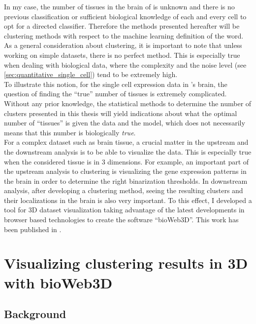 	In my case, the number of tissues in the brain of \platy{} is unknown and there is no previous classification or sufficient biological knowledge of each and every cell to opt for a directed classifier. Therefore the methods presented hereafter will be clustering methods with respect to the machine learning definition of the word.\\
	
	As a general consideration about clustering, it is important to note that unless working on simple datasets, there is no perfect method. This is especially true when dealing with biological data, where the complexity and the noise level (see \ref{sec:quantitative_single_cell}) tend to be extremely high. \\
	
	To illustrate this notion, for the single cell expression data in \platy{}'s brain, the question of finding the ``true'' number of tissues is extremely complicated. Without any prior knowledge, the statistical methods to determine the number of clusters presented in this thesis will yield indications about what the optimal number of ``tissues'' is given the data and the model, which does not necessarily means that this number is biologically \emph{true}.\\
	
	For a complex dataset such as brain tissue, a crucial matter in the upstream and the downstream analysis is to be able to visualize the data. This is especially true when the considered tissue is in 3 dimensions. For example, an important part of the upstream analysis to clustering is visualizing the gene expression patterns in the brain in order to determine the right binarization thresholds. In downstream analysis, after developing a clustering method, seeing the resulting clusters and their localizations in the brain is also very important. To this effect, I developed a tool for 3D dataset visualization taking advantage of the latest developments in browser based technologies to create the software ``bioWeb3D''. This work has been published in \cite{Pettit13}.
	
	

\section{Visualizing clustering results in 3D with bioWeb3D}
	\subsection{Background}

